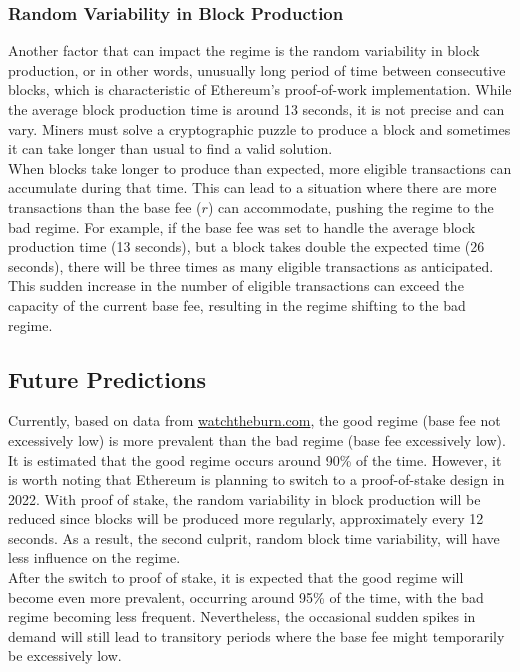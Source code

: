 \subsubsection{Random Variability in Block Production}
Another factor that can impact the regime is the random variability in block production, or in other words, unusually long period of time between consecutive blocks, which is characteristic of Ethereum's proof-of-work implementation. While the average block production time is around 13 seconds, it is not precise and can vary. Miners must solve a cryptographic puzzle to produce a block and sometimes it can take longer than usual to find a valid solution.\\

When blocks take longer to produce than expected, more eligible transactions can accumulate during that time. This can lead to a situation where there are more transactions than the base fee ($r$) can accommodate, pushing the regime to the bad regime. For example, if the base fee was set to handle the average block production time (13 seconds), but a block takes double the expected time (26 seconds), there will be three times as many eligible transactions as anticipated. This sudden increase in the number of eligible transactions can exceed the capacity of the current base fee, resulting in the regime shifting to the bad regime.

\subsection{Future Predictions}
Currently, based on data from \url{watchtheburn.com}, the good regime (base fee not excessively low) is more prevalent than the bad regime (base fee excessively low). It is estimated that the good regime occurs around 90\% of the time. However, it is worth noting that Ethereum is planning to switch to a proof-of-stake design in 2022. With proof of stake, the random variability in block production will be reduced since blocks will be produced more regularly, approximately every 12 seconds. As a result, the second culprit, random block time variability, will have less influence on the regime.\\

After the switch to proof of stake, it is expected that the good regime will become even more prevalent, occurring around 95\% of the time, with the bad regime becoming less frequent. Nevertheless, the occasional sudden spikes in demand will still lead to transitory periods where the base fee might temporarily be excessively low.

